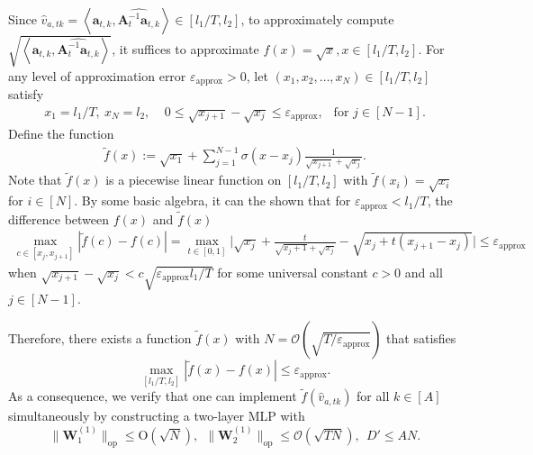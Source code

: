 \documentclass[10pt]{article}
\renewcommand{\hat}{\widehat}
\newcommand{\eps}{\varepsilon}
\newcommand{\lops}[1]{\|{#1}\|_{\mathrm{op}}}
\renewcommand{\cO}{\mathcal{O}}
\newcommand{\<}{\left\langle}
\renewcommand{\>}{\right\rangle}
\newcommand{\lran}{{l_1}} %
\newcommand{\uran}{{l_2}}  %
\newcommand{\appr}{{\mathrm{approx}}}  %
\newcommand{\hidden}{{D'}}
\newcommand{\conO}{{\mathrm{O}}}
\def\bA{{\mathbf A}}
\def\bW{{\mathbf W}}
\def\ba{{\mathbf a}}
\newcommand{\authnote}[2]{{\scriptsize $\ll$\textsf{#1 notes: #2}$\gg$}}
\newcommand{\authnote}[2]{}
\newcommand{\lc}[1]{{\color{blue}\authnote{Licong}{#1}}}
\begin{document}
Since $\hat v_{a,tk}=\<\ba_{t,k},\widehat{\bA_t^{-1}\ba_{t,k}}\>\in[\lran/T,\uran]$, to approximately compute $\sqrt{\<\ba_{t,k},\widehat{\bA_t^{-1}\ba_{t,k}}\>}$, it suffices to approximate $f(x)=\sqrt{x},x\in[\lran/T,\uran]$. For any  level of approximation error $\eps_\appr>0$, let $(x_1,x_2,\ldots,x_N)\in[\lran/T,\uran]$ satisfy
\begin{align*}
x_1=\lran/T,~x_N=\uran,   ~~~~~
    0\leq\sqrt{x_{j+1}}-\sqrt{x_{j}}\leq\eps_\appr,~~\text{ for }j\in[N-1].
\end{align*}
Define the function
\begin{align*}
    \tilde f(x):=\sqrt{x_1}+\sum_{j=1}^{N-1}\sigma(x-x_{j})\frac{1}{\sqrt{x_{j+1}}+\sqrt{x_j}}.
\end{align*} Note that $\tilde f(x)$ is a piecewise linear function on $[\lran/T,\uran]$ with $\tilde f(x_i)=\sqrt{x_i}$ for $i\in[N]$. By some basic algebra,  it can the shown that for $\eps_\appr<\lran/T$, the difference between $f(x)$ and $\tilde f(x)$
\begin{align*}
   \max_{c\in[x_j,x_{j+1}]} |\tilde f(c)-f(c)|=\max_{t\in[0,1]}\Big|\sqrt{x_j}+\frac{t}{\sqrt{x_j+1}+\sqrt{x_j}}-\sqrt{x_j+t(x_{j+1}-x_j)}\Big|\leq\eps_\appr
\end{align*} when $\sqrt{x_{j+1}}-\sqrt{x_{j}}<c\sqrt{\eps_\appr\lran/T}$ for some universal constant $c>0$ and all $j\in[N-1]$. 

Therefore, 
 there exists a function $\tilde f(x)$ with $N=\cO(\sqrt{T/\eps_\appr})$ that satisfies $$\max_{[\lran/T,\uran]}|\tilde f(x)-f(x)|\leq\eps_\appr.$$ 
 As a consequence, we verify that one can implement $\tilde f(\hat v_{a,tk})$ for all $k\in[A]$ simultaneously  by constructing a two-layer MLP with $$\lops{\bW_1^{(1)}}\leq \conO(\sqrt{N}),~~\lops{\bW_2^{(1)}}\leq \cO(\sqrt{TN}),~~\hidden\leq AN.$$






 
\end{document}
